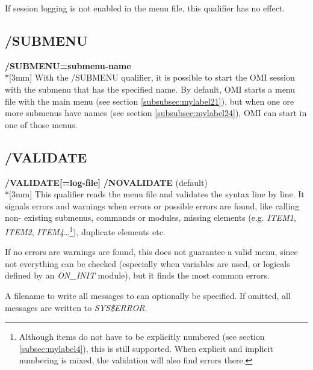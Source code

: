 \documentclass[a4paper]{book}
\newcommand{\vs}{\vspace{3mm}}
\renewcommand{\indent}{\hspace*{5mm}}
\begin{document}
\vs

If session logging is not enabled in the menu file, this qualifier has no effect.

\subsection{/SUBMENU}
\label{subsubsec:mylabel7}

\vs

\indent\textbf{/SUBMENU=submenu-name}\\*[3mm]
With the \textsf{/SUBMENU} qualifier, it is possible to start the OMI session with 
the submenu that has the specified name. By default, OMI starts a menu file 
with the main menu (see section \ref{subsubsec:mylabel21}), but when 
one ore more submenus have names (see section \ref{subsubsec:mylabel24}),
OMI can start in one of those menus.

\subsection{/VALIDATE}
\label{subsubsec:mylabel8}

\vs

\indent\textbf{/VALIDATE[=log-file]} \newline
\indent\textbf{/NOVALIDATE} (default)\\*[3mm]
This qualifier reads the menu file and validates the syntax line by line. It 
signals errors and warnings when errors or possible errors are found, like 
calling non- existing submenus, commands or modules, missing elements (e.g. 
\textsl{ITEM1}, \textsl{ITEM2}, \textsl{ITEM4}\ldots\footnote{ Although items do not
have to be explicitly numbered (see section \ref{subsec:mylabel4}), this is still supported.
When explicit and implicit numbering is mixed, the validation will also find errors there.}), duplicate elements etc.

\vs

If no errors are warnings are found, this does not guarantee a valid menu, 
since not everything can be checked (especially when variables are used, or 
logicals defined by an \textsl{ON{\_}INIT} module), but it finds the most common 
errors.

\vs

A filename to write all messages to can optionally be specified. If omitted, 
all messages are written to \textsl{SYS{\$}ERROR}.
\end{document}
